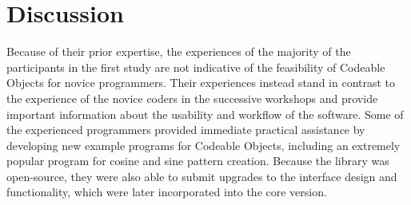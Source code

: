 		
\section{Discussion}


Because of their prior expertise, the experiences of the majority of the participants in the first study are not indicative of the feasibility of Codeable Objects for novice programmers. Their experiences instead stand in contrast to the experience of the novice coders in the successive workshops and provide important information about the usability and workflow of the software. Some of the experienced programmers provided immediate practical assistance by developing new example programs for Codeable Objects, including an extremely popular program for cosine and sine pattern creation. Because the library was open-source, they were also able to submit upgrades to the interface design and functionality, which were later incorporated into the core version.

